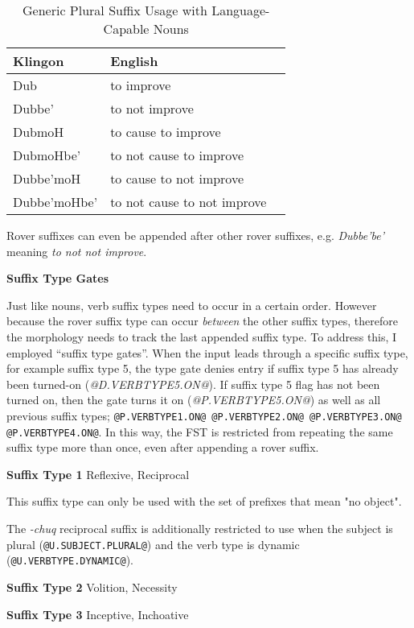 \documentclass[11pt]{article}
\begin{document}
	\begin{table}[h]
	\begin{center}
	\begin{tabular}{lll}
	\toprule
	\bf Klingon & \bf English \\
	\midrule
	Dub & to improve \\
	Dubbe' & to not improve \\
	DubmoH & to cause to improve \\
	DubmoHbe' & to not cause to improve \\
	Dubbe'moH & to cause to not improve \\
	Dubbe'moHbe' & to not cause to not improve \\
	\bottomrule
	\end{tabular}
	\end{center}
	\caption{Generic Plural Suffix Usage with Language-Capable Nouns}
	\end{table}

Rover suffixes can even be appended after other rover suffixes, e.g. \textit{Dubbe'be'} meaning \textit{to not not improve}.

\textbf{Suffix Type Gates}

Just like nouns, verb suffix types need to occur in a certain order. However because the rover suffix type can occur \textit{between} the other suffix types, therefore the morphology needs to track the last appended suffix type. To address this, I employed ``suffix type gates''. When the input leads through a specific suffix type, for example suffix type 5, the type gate denies entry if suffix type 5 has already been turned-on (\textit{@D.VERBTYPE5.ON@}). If suffix type 5 flag has not been turned on, then the gate turns it on (\textit{@P.VERBTYPE5.ON@}) as well as all previous suffix types; \texttt{@P.VERBTYPE1.ON@ @P.VERBTYPE2.ON@ @P.VERBTYPE3.ON@ @P.VERBTYPE4.ON@}. In this way, the FST is restricted from repeating the same suffix type more than once, even after appending a rover suffix.

\textbf{Suffix Type 1} Reflexive, Reciprocal
	
This suffix type can only be used with the set of prefixes that mean "no object".

The \textit{-chuq} reciprocal suffix is additionally restricted to use when the subject is plural (\texttt{@U.SUBJECT.PLURAL@}) and the verb type is dynamic (\texttt{@U.VERBTYPE.DYNAMIC@}).

\textbf{Suffix Type 2} Volition, Necessity

\textbf{Suffix Type 3} Inceptive, Inchoative
\end{document}
